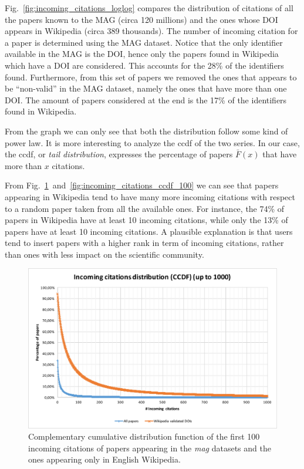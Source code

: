Fig.~\ref{fig:incoming_citations_loglog} compares the distribution of citations of all the papers known to the MAG (circa 120 millions) and the ones whose \ac{DOI} appears in Wikipedia (circa 389 thousands).
The number of incoming citation for a paper is determined using the \ac{MAG} dataset.
Notice that the only identifier available in the \ac{MAG} is the \ac{DOI}, hence only the papers found in Wikipedia which have a \ac{DOI} are considered.
This accounts for the 28\% of the identifiers found.
Furthermore, from this set of papers we removed the ones that appears to be ``non-valid'' in the \ac{MAG} dataset, namely the ones that have more than one \ac{DOI}.
The amount of papers considered at the end is the 17\% of the identifiers found in Wikipedia.

From the graph we can only see that both the distribution follow some kind of power law.
It is more interesting to analyze the \ac{ccdf} of the two series.
In our case, the \ac{ccdf}, or \emph{tail distribution}, expresses the percentage of papers $\bar{F}(x)$ that have more than $x$ citations.

From Fig.~\ref{fig:incoming_citations_ccdf_1000}~and~\ref{fig:incoming_citations_ccdf_100} we can see that papers appearing in Wikipedia tend to have many more incoming citations with respect to a random paper taken from all the available ones.
For instance, the 74\% of papers in Wikipedia have at least 10 incoming citations, while only the 13\% of papers have at least 10 incoming citations.
A plausible explanation is that users tend to insert papers with a higher rank in term of incoming citations, rather than ones with less impact on the scientific community.




\begin{figure}[h]
\centering
\includegraphics[keepaspectratio=true, width=\textwidth]{assets/incoming_cits_ccdf_1000}
\caption{Complementary cumulative distribution function of the first 100 incoming citations of papers appearing in the \emph{mag} datasets and the ones appearing only in English Wikipedia.}
\label{fig:incoming_citations_ccdf_1000}
\end{figure}

